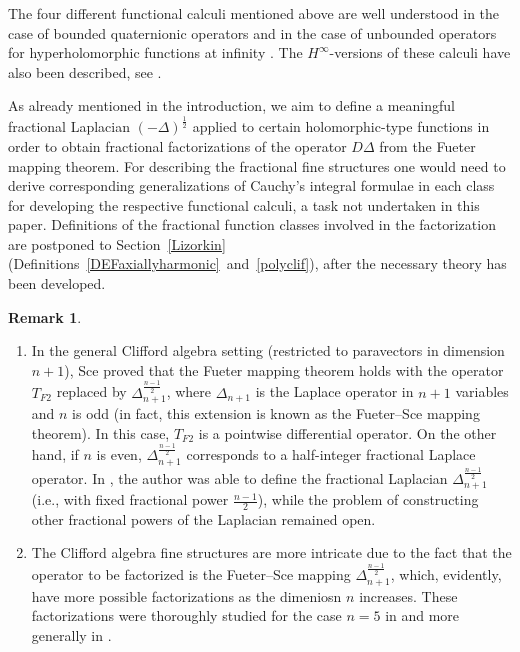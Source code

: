 \documentclass[reqno,11pt]{amsart}
\theoremstyle{definition}
\newtheorem{remark}[theorem]{Remark}
\begin{document}
The four different functional calculi mentioned above are well understood in the case of bounded quaternionic operators and in the case of unbounded operators for hyperholomorphic functions at infinity \cite{CDP23}. The $H^\infty$-versions of these calculi have also been described, see \cite{Hinfty, CPS1,DPS}.

\medskip

As already mentioned in the introduction, we aim to define a meaningful fractional Laplacian $(-\Delta)^\frac{1}{2}$ applied to certain holomorphic-type functions in order to obtain fractional factorizations of the operator $D\Delta$ from the Fueter mapping theorem. For describing the fractional fine structures one would need to derive corresponding generalizations of Cauchy's integral formulae in each class for developing the respective functional calculi, a task not undertaken in this paper. Definitions of the fractional function classes involved in the factorization are postponed to Section~\ref{Lizorkin} (Definitions~\ref{DEFaxiallyharmonic}~and~\ref{polyclif}), after the necessary theory has been developed.



\begin{remark}
	\begin{enumerate}[wide,label=(\textnormal{\roman{*}})]
		\item  In the general Clifford algebra setting (restricted to paravectors in dimension $n+1$), Sce \cite{ColSabStrupSce,Sce}
		proved that the Fueter mapping theorem holds with the operator $T_{F2}$ replaced by $\Delta_{n+1}^{\frac{n-1}{2}}$, where $\Delta_{n+1}$ is the Laplace operator in $n+1$ variables and $n$ is odd (in fact, this extension is known as the Fueter--Sce mapping theorem).
		In this case, $T_{F2}$ is a pointwise differential operator. On the other hand, if $n$ is even, $\Delta_{n+1}^{\frac{n-1}{2}}$ corresponds to a half-integer fractional Laplace operator. In \cite{Q}, the author was able to define the fractional Laplacian $\Delta_{n+1}^{\frac{n-1}{2}}$ (i.e., with fixed fractional power $\frac{n-1}{2}$), while the problem of constructing other fractional powers of the Laplacian remained open.
		\item The Clifford algebra fine structures are more intricate due to the fact that the operator to be factorized is the Fueter--Sce mapping $ \Delta_{n+1}^{\frac{n-1}{2}}$, which, evidently, have more possible factorizations as the dimeniosn $n$ increases. These factorizations were thoroughly studied for the case $n = 5 $ in \cite{Fivedim} and more generally in \cite{CDP25}.
	\end{enumerate}
\end{remark}
\end{document}
